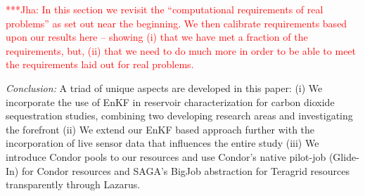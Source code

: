 \documentclass{rspublic}
\newcommand{\jhanote}[1]{ {\textcolor{red} { ***Jha: #1 }}}
\newcommand{\jhanote}[1]{}
\begin{document}
\jhanote{In this section we revisit the ``computational requirements
  of real problems'' as set out near the beginning. We then calibrate
  requirements based upon our results here -- showing (i) that we have
  met a fraction of the requirements, but, (ii) that we need to do
  much more in order to be able to meet the requirements laid out for
  real problems.}
  
{\it Conclusion: } A triad of unique aspects are developed in this
paper: (i) We incorporate the use of EnKF in reservoir
characterization for carbon dioxide sequestration studies, combining
two developing research areas and investigating the forefront (ii) We
extend our EnKF based approach further with the incorporation of live
sensor data that influences the entire study (iii) We introduce Condor
pools to our resources and use Condor's native pilot-job (Glide-In)
for Condor resources and SAGA's BigJob abstraction for Teragrid
resources transparently through Lazarus. 



\end{document}
